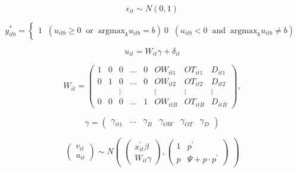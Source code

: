 \documentclass[11pt]{jsarticle}
\begin{document}
\begin{equation} \label{formulad2_4}
\epsilon_{it} \sim N(0, 1)
\end{equation}


\begin{equation} \label{formulad2_5}
y^\ast_{itb} = \begin{cases}
             1 \;\; ( u_{itb} \geq 0 \;\; \mbox{or} \;\; \mbox{argmax}_{k}u_{itb} = b)\
             0 \;\; ( u_{itb} < 0 \;\; \mbox{and} \;\; \mbox{argmax}_{k}u_{itb} \neq b)\
             \end{cases}
\end{equation}

\begin{equation} \label{formulad2_6}
u_{it} = W_{it}\gamma + \delta_{it}
\end{equation}

\begin{equation} \label{formulad2_7}
  W_{it} =
  \begin{pmatrix}
      1 & 0 & 0 & \ldots & 0 & OW_{it1} & OT_{it1} & D_{it1} \\
      0 & 1 & 0 & \ldots & 0 & OW_{it2} & OT_{it2} & D_{it2} \\
       &  & \vdots &  &  & \vdots & \vdots & \vdots \\
      0 & 0 & 0 & \ldots & 1 & OW_{itB} & OT_{itB} & D_{itB}
    \end{pmatrix}
    ,
\end{equation}

\begin{equation} \label{formulad2_8}
  \gamma =
  \begin{pmatrix}
      \gamma_{it1} & \ldots & \gamma_{B} & \gamma_{OW} & \gamma_{OT} & \gamma_{D}
   \end{pmatrix}
\end{equation}

\begin{equation} \label{formulad2_9}
  \begin{pmatrix}
      v_{it} \\
      u_{it} 
   \end{pmatrix}
   \sim N
  \begin{pmatrix}
	  \begin{pmatrix}
	  x^{\prime}_{it}\beta\\
	  W_{it}\gamma
	  \end{pmatrix}
	  ,
	  \begin{pmatrix}
	  1 & p^\prime\\
	  p & \Psi + p \cdot p^\prime
	  \end{pmatrix}
  \end{pmatrix}
\end{equation}
\end{document}

